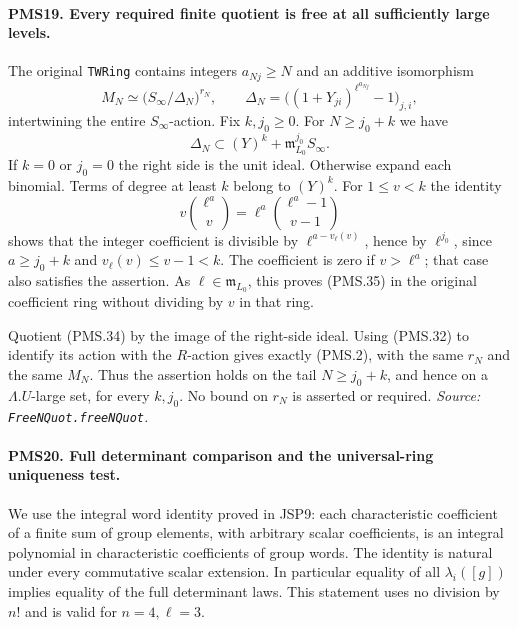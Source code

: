 \paragraph{PMS19. Every required finite quotient is free at all sufficiently large levels.}
\label{claim:PMS19}
The original \texttt{TWRing} contains integers $a_{Nj}\geq N$
and an additive isomorphism
\[
 M_N\simeq
 \bigl(S_\infty/\Delta_N\bigr)^{r_N},\qquad
 \Delta_N=\bigl((1+Y_{ji})^{\ell^{a_{Nj}}}-1\bigr)_{j,i},
                                                        \tag{PMS.34}
\]
intertwining the entire $S_\infty$-action.  Fix $k,j_0\geq0$.
For $N\geq j_0+k$ we have
\[
 \Delta_N\subset (Y)^k+\mathfrak m_{L_0}^{j_0}S_\infty.
                                                        \tag{PMS.35}
\]
If $k=0$ or $j_0=0$ the right side is the unit ideal.
Otherwise expand each binomial.  Terms of degree at least $k$
belong to $(Y)^k$.  For $1\leq v<k$ the identity
\[
 v\binom{\ell^a}{v}=\ell^a\binom{\ell^a-1}{v-1}
\]
shows that the integer coefficient is divisible by
$\ell^{a-v_\ell(v)}$, hence by $\ell^{j_0}$, since
$a\geq j_0+k$ and $v_\ell(v)\leq v-1<k$.
The coefficient is zero if $v>\ell^a$; that case also satisfies
the assertion.  As $\ell\in\mathfrak m_{L_0}$, this proves
(PMS.35) in the original coefficient ring without dividing by
$v$ in that ring.

Quotient (PMS.34) by the image of the right-side ideal.
Using (PMS.32) to identify its action with the $R$-action gives
exactly (PMS.2), with the same $r_N$ and the same $M_N$.
Thus the assertion holds on the tail $N\geq j_0+k$, and hence
on a $\Lambda.U$-large set, for every $k,j_0$.
No bound on $r_N$ is asserted or required.
\hfill\textit{Source: \texttt{FreeNQuot.freeNQuot}.}

\paragraph{PMS20. Full determinant comparison and the universal-ring uniqueness test.}
\label{claim:PMS20}
We use the integral word identity proved in JSP9: each
characteristic coefficient of a finite sum of group elements,
with arbitrary scalar coefficients, is an integral polynomial
in characteristic coefficients of group words.  The identity
is natural under every commutative scalar extension.  In
particular equality of all $\lambda_i([g])$ implies equality
of the full determinant laws.  This statement uses no division
by $n!$ and is valid for $n=4,\ell=3$.

